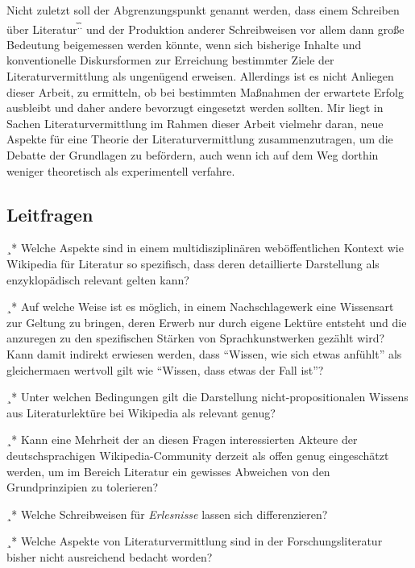 \documentclass[fontsize=12pt]{scrartcl}
\begin{document}
Nicht zu\-letzt soll der Abgrenzungspunkt genannt werden, dass einem Schrei\-ben \"uber Li\-te\-ra\-tur\textsuperscript{\~.\~.} und der Produktion an\-de\-rer Schreibweisen vor allem dann gro{\ss}e Bedeutung bei\-ge\-mes\-sen werden k\"onnte, wenn sich bis\-herige Inhalte und konventionelle Diskursformen zur Erreichung bestimmter Ziele der Li\-te\-ra\-tur\-ver\-mitt\-lung als ungen\"ugend erweisen. Al\-ler\-dings ist es nicht Anliegen dieser Arbeit, zu ermitteln, ob bei bestimmten Ma{\ss}nahmen der erwartete Erfolg ausbleibt und daher andere bevorzugt eingesetzt werden sollten. Mir liegt in Sachen Li\-te\-ra\-tur\-ver\-mitt\-lung im Rahmen dieser Arbeit vielmehr daran, neue Aspekte f\"ur eine Theorie der Li\-te\-ra\-tur\-ver\-mitt\-lung zusammenzutragen, um die Debatte der Grundlagen zu bef\"ordern, auch wenn ich auf dem Weg dorthin weniger theo\-retisch als experimentell verfahre.

\subsection{Leitfragen}
\label{subsec:2.4}

¸* Welche Aspekte sind in einem multidisziplin\"aren web\"of\-fent\-lichen Kontext wie Wi\-ki\-pe\-dia f\"ur Li\-te\-ra\-tur so spezifisch, dass deren detaillierte Darstellung als enzy\-klop\"adisch relevant gelten kann?

¸* Auf welche Weise ist es m\"oglich, in einem Nachschlagewerk eine Wissensart zur Geltung zu bringen, deren Erwerb nur durch eigene Lekt\"ure entsteht und die anzuregen zu den spezifischen St\"arken von Sprachkunstwerken gez\"ahlt wird? Kann damit indirekt erwiesen werden, dass "`Wissen, wie sich etwas anf\"uhlt"' als glei\-cherma\-{\ss}en wertvoll gilt wie "`Wissen, dass etwas der Fall ist"'?

¸* Unter welchen Bedingungen gilt die Darstellung nicht-pro\-po\-si\-ti\-o\-na\-len Wissens aus Li\-te\-ra\-tur\-lekt\"ure bei Wi\-ki\-pe\-dia als relevant genug? 

¸* Kann eine Mehrheit der an diesen Fragen interessierten Akteure\textsuperscript{\tiny *} der deutschspra\-chi\-gen Wi\-ki\-pe\-dia-Community derzeit als offen genug eingesch\"atzt werden, um im Be\-reich Li\-te\-ra\-tur ein gewisses Abweichen von den Grundprinzipien zu tolerieren?

¸* Welche Schreibweisen f\"ur \textit{Erlesnisse} lassen sich differenzieren? 

¸* Welche Aspekte von Li\-te\-ra\-tur\-ver\-mitt\-lung sind in der For\-schungsli\-te\-ra\-tur bis\-her nicht ausreichend bedacht worden?
\end{document}
